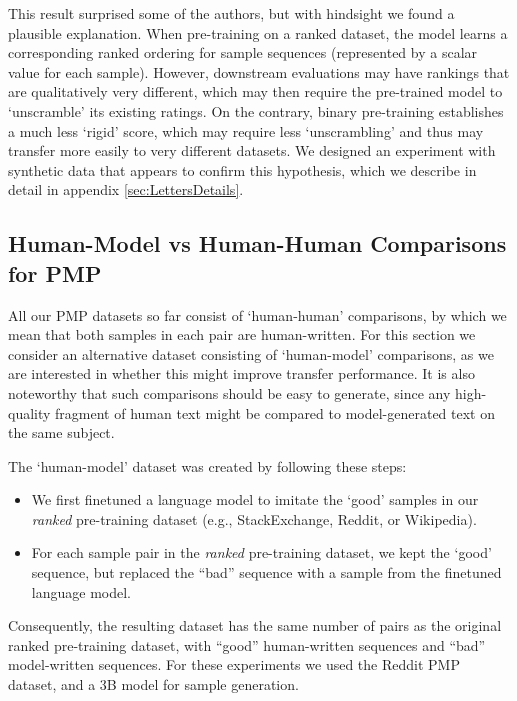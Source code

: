 This result surprised some of the authors, but with hindsight we found a plausible explanation. When pre-training on a ranked dataset, the model learns a corresponding ranked ordering  for sample sequences (represented by a scalar value for each sample). However, downstream evaluations may have rankings that are qualitatively very different, which may then require the pre-trained model to `unscramble' its existing ratings. On the contrary, binary pre-training establishes a much less `rigid'  score, which may require less `unscrambling' and thus may transfer more easily to very different datasets.   We designed an experiment with synthetic data that appears to confirm this hypothesis, which we describe in detail in appendix \ref{sec:LettersDetails}.

\subsection{Human-Model vs Human-Human Comparisons for PMP}

All our PMP datasets so far consist of `human-human' comparisons, by which we mean that both samples in each pair are human-written. For this section we consider an alternative dataset consisting of `human-model' comparisons, as we are interested in whether this might improve transfer performance.  It is also noteworthy that such comparisons should be easy to generate, since any high-quality fragment of human text might be compared to model-generated text on the same subject.

The `human-model' dataset was created by following these steps:

\begin{itemize}
    \item We first finetuned a language model to imitate the `good' samples in our \emph{ranked} pre-training dataset (e.g., StackExchange, Reddit, or Wikipedia).  
    \item
    For each sample pair in the \emph{ranked} pre-training dataset, we kept the `good' sequence,  but replaced the ``bad'' sequence with a sample from the finetuned  language model.
\end{itemize}

Consequently, the resulting dataset has the same number of pairs as the original ranked pre-training dataset, with  ``good'' human-written sequences and ``bad'' model-written sequences.  For these experiments we used the Reddit PMP dataset, and a 3B model for sample generation.

